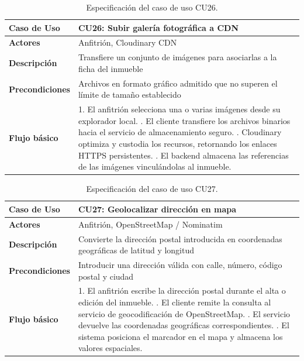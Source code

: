 \begin{table}[H]
\centering
\begin{tabular}{|p{3.1cm}|p{10.9cm}|}
\hline
\textbf{Caso de Uso} & \textbf{CU26: Subir galería fotográfica a CDN} \\ \hline
\textbf{Actores} & Anfitrión, Cloudinary CDN \\ \hline
\textbf{Descripción} & Transfiere un conjunto de imágenes para asociarlas a la ficha del inmueble \\ \hline
\textbf{Precondiciones} & Archivos en formato gráfico admitido que no superen el límite de tamaño establecido \\ \hline
\textbf{Flujo básico} & 
1. El anfitrión selecciona una o varias imágenes desde su explorador local. \newline
2. El cliente transfiere los archivos binarios hacia el servicio de almacenamiento seguro. \newline
3. Cloudinary optimiza y custodia los recursos, retornando los enlaces HTTPS persistentes. \newline
4. El backend almacena las referencias de las imágenes vinculándolas al inmueble. \\ \hline
\end{tabular}
\caption{Especificación del caso de uso CU26.}
\label{tab:cu26}
\end{table}

\begin{table}[H]
\centering
\begin{tabular}{|p{3.1cm}|p{10.9cm}|}
\hline
\textbf{Caso de Uso} & \textbf{CU27: Geolocalizar dirección en mapa} \\ \hline
\textbf{Actores} & Anfitrión, OpenStreetMap / Nominatim \\ \hline
\textbf{Descripción} & Convierte la dirección postal introducida en coordenadas geográficas de latitud y longitud \\ \hline
\textbf{Precondiciones} & Introducir una dirección válida con calle, número, código postal y ciudad \\ \hline
\textbf{Flujo básico} & 
1. El anfitrión escribe la dirección postal durante el alta o edición del inmueble. \newline
2. El cliente remite la consulta al servicio de geocodificación de OpenStreetMap. \newline
3. El servicio devuelve las coordenadas geográficas correspondientes. \newline
4. El sistema posiciona el marcador en el mapa y almacena los valores espaciales. \\ \hline
\end{tabular}
\caption{Especificación del caso de uso CU27.}
\label{tab:cu27}
\end{table}

